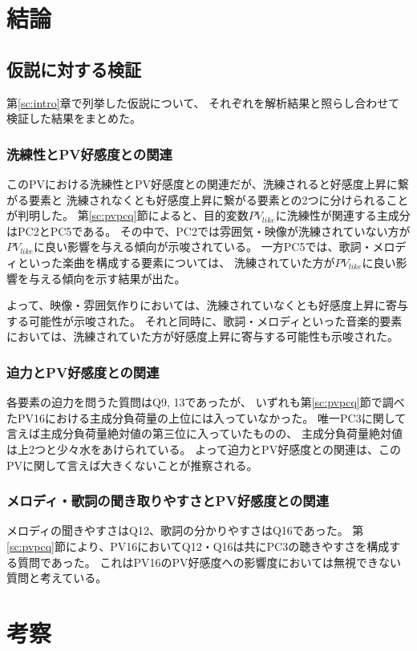\documentclass[11pt,a4paper, uplatex]{jsarticle}
\begin{document}
\section{結論}
\subsection{仮説に対する検証}
第\ref{sc:intro}章で列挙した仮説について、
それぞれを解析結果と照らし合わせて検証した結果をまとめた。
\subsubsection{洗練性とPV好感度との関連}
\label{sc:pvsenren}
このPVにおける洗練性とPV好感度との関連だが、洗練されると好感度上昇に繋がる要素と
洗練されなくとも好感度上昇に繋がる要素との2つに分けられることが判明した。
第\ref{sc:pvpcq}節によると、目的変数$ PV_{like} $に洗練性が関連する主成分はPC2とPC5である。
その中で、PC2では雰囲気・映像が洗練されていない方が$ PV_{like} $に良い影響を与える傾向が示唆されている。
一方PC5では、歌詞・メロディといった楽曲を構成する要素については、
洗練されていた方が$ PV_{like} $に良い影響を与える傾向を示す結果が出た。

よって、映像・雰囲気作りにおいては、洗練されていなくとも好感度上昇に寄与する可能性が示唆された。
それと同時に、歌詞・メロディといった音楽的要素においては、洗練されていた方が好感度上昇に寄与する可能性も示唆された。

\subsubsection{迫力とPV好感度との関連}
各要素の迫力を問うた質問はQ9, 13であったが、
いずれも第\ref{sc:pvpcq}節で調べたPV16における主成分負荷量の上位には入っていなかった。
唯一PC3に関して言えば主成分負荷量絶対値の第三位に入っていたものの、
主成分負荷量絶対値は上2つと少々水をあけられている。
よって迫力とPV好感度との関連は、このPVに関して言えば大きくないことが推察される。

\subsubsection{メロディ・歌詞の聞き取りやすさとPV好感度との関連}
メロディの聞きやすさはQ12、歌詞の分かりやすさはQ16であった。
第\ref{sc:pvpcq}節により、PV16においてQ12・Q16は共にPC3の聴きやすさを構成する質問であった。
これはPV16のPV好感度への影響度においては無視できない質問と考えている。

\section{考察}
\end{document}
